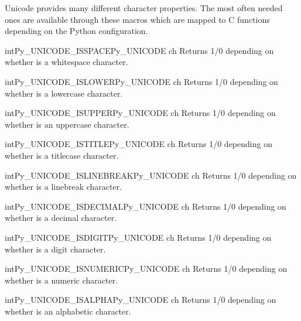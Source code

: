 Unicode provides many different character properties. The most often
needed ones are available through these macros which are mapped to C
functions depending on the Python configuration.

\begin{cfuncdesc}{int}{Py_UNICODE_ISSPACE}{Py_UNICODE ch}
  Returns 1/0 depending on whether  is a whitespace
  character.
\end{cfuncdesc}

\begin{cfuncdesc}{int}{Py_UNICODE_ISLOWER}{Py_UNICODE ch}
  Returns 1/0 depending on whether  is a lowercase character.
\end{cfuncdesc}

\begin{cfuncdesc}{int}{Py_UNICODE_ISUPPER}{Py_UNICODE ch}
  Returns 1/0 depending on whether  is an uppercase
  character.
\end{cfuncdesc}

\begin{cfuncdesc}{int}{Py_UNICODE_ISTITLE}{Py_UNICODE ch}
  Returns 1/0 depending on whether  is a titlecase character.
\end{cfuncdesc}

\begin{cfuncdesc}{int}{Py_UNICODE_ISLINEBREAK}{Py_UNICODE ch}
  Returns 1/0 depending on whether  is a linebreak character.
\end{cfuncdesc}

\begin{cfuncdesc}{int}{Py_UNICODE_ISDECIMAL}{Py_UNICODE ch}
  Returns 1/0 depending on whether  is a decimal character.
\end{cfuncdesc}

\begin{cfuncdesc}{int}{Py_UNICODE_ISDIGIT}{Py_UNICODE ch}
  Returns 1/0 depending on whether  is a digit character.
\end{cfuncdesc}

\begin{cfuncdesc}{int}{Py_UNICODE_ISNUMERIC}{Py_UNICODE ch}
  Returns 1/0 depending on whether  is a numeric character.
\end{cfuncdesc}

\begin{cfuncdesc}{int}{Py_UNICODE_ISALPHA}{Py_UNICODE ch}
  Returns 1/0 depending on whether  is an alphabetic
  character.
\end{cfuncdesc}

